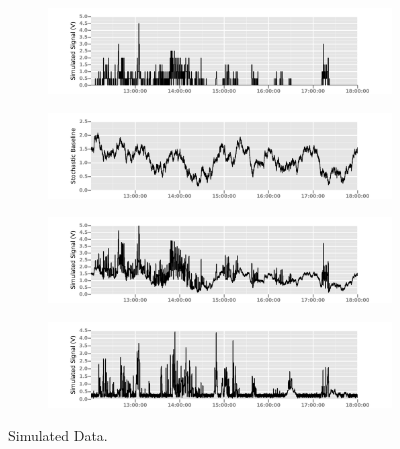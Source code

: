 \documentclass[fontsize=11pt]{scrartcl} %
\begin{document}
\begin{figure}[h!]
\begin{subfigure}[b]{\textwidth}			
	\includegraphics[width=\linewidth]{BaseSim}
\end{subfigure}
\begin{subfigure}[b]{\textwidth}
	\includegraphics[width=\linewidth]{BaseRand}
\end{subfigure}
\begin{subfigure}[b]{\textwidth}
	\includegraphics[width=\linewidth]{BaseTotal}
\end{subfigure}
\begin{subfigure}[b]{\textwidth}
	\includegraphics[width=\linewidth]{RemoteTotal}
\end{subfigure}
\caption{Simulated Data.}
\end{figure}

\newpage
\end{document}

